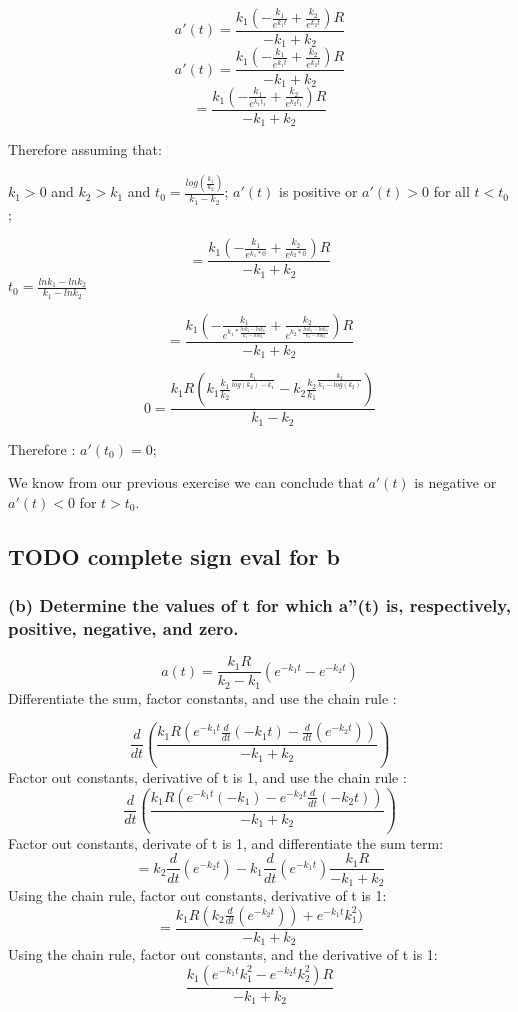 \documentclass[]{article}
\begin{document}
\[a'(t) = \frac{k_1 ( -\frac{k_1}{e^{k_1t}}+\frac{k_2}{e^{k_2t}})R}{-k_1 + k_2}\]
\[a'(t) = \frac{k_1 ( -\frac{k_1}{e^{k_1t}}+\frac{k_2}{e^{k_2t}})R}{-k_1 + k_2}\]
\[= \frac{k_1 ( -\frac{k_1}{e^{k_1 t_1}}+\frac{k_2}{e^{k_2 t_1}})R}{-k_1 + k_2}\]

Therefore assuming that:

\(k_1 > 0\) and \(k_2 > k_1\) and
\(t_0 = \frac{log(\frac{k_1}{k_2})}{k_1 - k_2}\); \(a'(t)\) is positive
or \(a'(t) > 0\) for all \(t < t_0\);

\[= \frac{k_1 ( -\frac{k_1}{e^{k_1*0}}+\frac{k_2}{e^{k_2*0}})R}{-k_1 + k_2}\]
\(t_0 = \frac{ln k_1 - ln k_2}{k_1 - lnk_2}\)

\[= \frac{k_1 ( -\frac{k_1}{e^{k_1*\frac{ln k_1 - ln k_2}{k_1 - lnk_2}}}+\frac{k_2}{e^{k_2*\frac{ln k_1 - ln k_2}{k_1 - lnk_2}}})R}{-k_1 + k_2}\]

\[0 = \frac{k_1 R (k_1 \frac{k_1}{k_2}^{\frac{k_1}{log(k_2)-k_1}} - k_2 \frac{k_2}{k_1}^{\frac{k_2}{k_1 - log(k_2)}})}{k_1 - k_2}\]

Therefore : \(a'(t_0) = 0\);

We know from our previous exercise we can conclude that \(a'(t)\) is
negative or \(a'(t) < 0\) for \(t > t_0\).

\subsection{TODO complete sign eval for
b}\label{todo-complete-sign-eval-for-b}

\subsubsection{(b) Determine the values of t for which a''(t) is,
respectively, positive, negative, and
zero.}\label{b-determine-the-values-of-t-for-which-at-is-respectively-positive-negative-and-zero.}

\[a(t) = \frac{k_1 R}{k_2-k_1}(e^{-k_1t} - e^{-k_2t})\] Differentiate
the sum, factor constants, and use the chain rule :

\[\frac{d}{dt}(\frac{k_1 R(e^{-k_1t}\frac{d}{dt}(-k_1t)-\frac{d}{dt}(e^{-k_2t}))}{-k_1 + k_2})\]
Factor out constants, derivative of t is 1, and use the chain rule :
\[\frac{d}{dt}(\frac{k_1R(e^{-k_1 t}(-k_1)- e^{-k_2t}\frac{d}{dt}(-k_2t))}{-k_1 + k_2})\]
Factor out constants, derivate of t is 1, and differentiate the sum
term:
\[= k_2 \frac{d}{dt}(e^{-k_2 t})-k_1\frac{d}{dt}(e^{-k_1t})\frac{k_1R}{-k_1 + k_2}\]
Using the chain rule, factor out constants, derivative of t is 1:
\[=\frac{k_1 R (k_2 \frac{d}{dt}(e^{-k_2t}))+e^{-k_1t}k_1^2)}{-k_1 + k_2}\]
Using the chain rule, factor out constants, and the derivative of t is
1: \[\frac{k_1(e^{-k_1 t}k_1^2-e^{-k_2 t}k_2^2)R}{-k_1+k_2}\]
\end{document}
